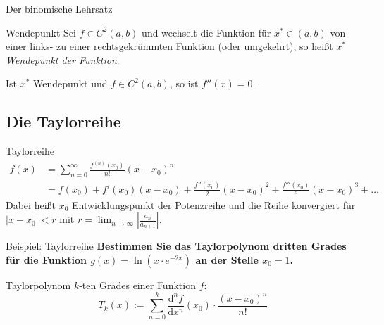 \documentclass[german]{spicker}
\renewcommand{\abs}[1]{\left| #1 \right|}
\begin{document}
\begin{defi}{Der binomische Lehrsatz}
\begin{defi}{Wendepunkt}
    Sei $f \in C^2(a, b)$ und wechselt die Funktion für $x^* \in (a, b)$ von einer links- zu einer rechtsgekrümmten Funktion (oder umgekehrt), so heißt $x^*$ \emph{Wendepunkt der Funktion}.

    Ist $x^*$ Wendepunkt und $f \in C^2(a, b)$, so ist $f''(x) = 0$.
\end{defi}

\subsection{Die Taylorreihe}

\begin{defi}{Taylorreihe}
    $$
        \begin{aligned}
            f(x) & = \sum^\infty_{n=0} \frac{f^{(n)}(x_0)}{n!} (x-x_0)^n                                           \\
                 & = f(x_0) + f'(x_0)(x-x_0) + \frac{f''(x_0)}{2}(x-x_0)^2 + \frac{f'''(x_0)}{6}(x-x_0)^3 + \ldots
        \end{aligned}
    $$
    Dabei heißt $x_0$ Entwicklungspunkt der Potenzreihe und die Reihe konvergiert für $\abs{x-x_0} < r$ mit $r = \lim_{n\to\infty}\abs{\frac{a_n}{a_{n+1}}}$.
\end{defi}

\begin{bonus}{Beispiel: Taylorreihe}
    \textbf{Bestimmen Sie das Taylorpolynom dritten Grades für die Funktion $g(x) = \ln(x\cdot e^{-2x})$ an der Stelle $x_0 = 1$.}

    Taylorpolynom $k$-ten Grades einer Funktion $f$:
    $$T_k(x) := \sum_{n=0}^k \frac{\mathrm{d}^n f}{\mathrm{d}x^n} (x_0)\cdot\frac{(x-x_0)^n}{n!} $$


\end{bonus}
\end{defi}
\end{document}
